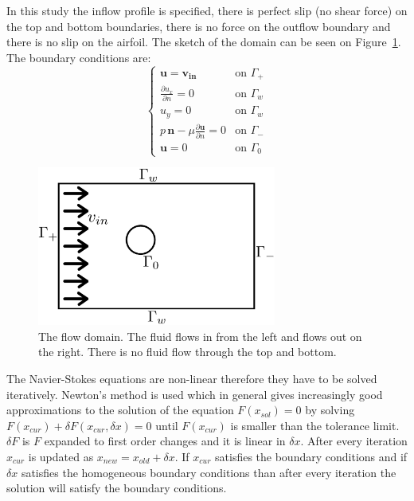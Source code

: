 \documentclass[12pt, a4paper]{article}
\begin{document}
    In this study the inflow profile is specified, there is perfect slip (no shear force) on the top and bottom boundaries, there is no force on the outflow boundary and there is no slip on the airfoil. The sketch of the domain can be seen on Figure~\ref{flow_domain}. The boundary conditions are:
    \begin{equation} \label{flow_boundary_conditions}
    \begin{cases}
    \mathbf{u} = \mathbf{v_{in}} & \text{on } \Gamma_+ \\
    \frac{\partial u_x}{\partial n} = 0 & \text{on } \Gamma_w \\
    u_y = 0  & \text{on } \Gamma_w \\
    p \, \mathbf{n} - \mu \frac{\partial \mathbf{u}}{\partial n} = 0 & \text{on } \Gamma_- \\
    \mathbf{u} = 0 & \text{on } \Gamma_0
    \end{cases}
    \end{equation}
    \begin{figure}[htbp]
        \centering
        \includegraphics[width=0.7\textwidth]{domain_vector_2}
        \caption{The flow domain. The fluid flows in from the left and flows out on the right. There is no fluid flow through the top and bottom.}
        \label{flow_domain}
    \end{figure}
    
    The Navier-Stokes equations are non-linear therefore they have to be solved iteratively. Newton's method is used which in general gives increasingly good approximations to the solution of the equation $F(x_{sol}) = 0$ by solving $F(x_{cur}) + \delta F(x_{cur}, \delta x) = 0$ until  $F(x_{cur})$ is smaller than the tolerance limit. $\delta F$ is $F$ expanded to first order changes and it is linear in $\delta x$. After every iteration $x_{cur}$ is updated as $x_{new} = x_{old} + \delta x$. If $x_{cur}$ satisfies the boundary conditions and if $\delta x$ satisfies the homogeneous boundary conditions than after every iteration the solution will satisfy the boundary conditions.
    
\end{document}
